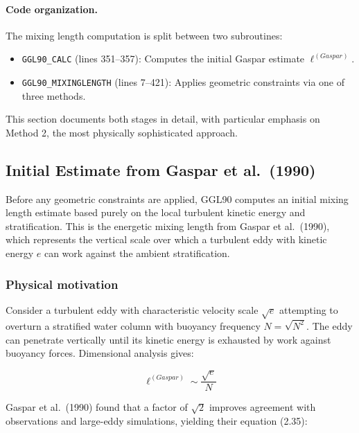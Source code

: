 \documentclass[12pt,letterpaper]{article}
\begin{document}
\paragraph{Code organization.} The mixing length computation is split between two subroutines:
\begin{itemize}
\item \verb|GGL90_CALC| (lines 351--357): Computes the initial Gaspar estimate $\ell^{(Gaspar)}$.
\item \verb|GGL90_MIXINGLENGTH| (lines 7--421): Applies geometric constraints via one of three methods.
\end{itemize}

This section documents both stages in detail, with particular emphasis on Method 2, the most physically sophisticated approach.

\subsection{Initial Estimate from Gaspar et al.\ (1990)}
\label{sec:mxl_gaspar}

Before any geometric constraints are applied, GGL90 computes an initial mixing length estimate based purely on the local turbulent kinetic energy and stratification. This is the energetic mixing length from Gaspar et al.\ (1990), which represents the vertical scale over which a turbulent eddy with kinetic energy $e$ can work against the ambient stratification.

\subsubsection{Physical motivation}

Consider a turbulent eddy with characteristic velocity scale $\sqrt{e}$ attempting to overturn a stratified water column with buoyancy frequency $N = \sqrt{N^2}$. The eddy can penetrate vertically until its kinetic energy is exhausted by work against buoyancy forces. Dimensional analysis gives:

\begin{equation}
\ell^{(Gaspar)} \sim \frac{\sqrt{e}}{N}
\end{equation}

Gaspar et al.\ (1990) found that a factor of $\sqrt{2}$ improves agreement with observations and large-eddy simulations, yielding their equation (2.35):
\end{document}

